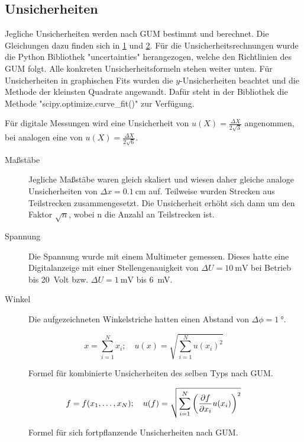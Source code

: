 \subsection{Unsicherheiten}\label{VGuD}

Jegliche Unsicherheiten werden nach GUM bestimmt und berechnet.
Die Gleichungen dazu finden sich in \ref{fig:GUM_combine} und \ref{fig:GUM_formula}.
Für die Unsicherheitsrechnungen wurde die Python Bibliothek "uncertainties" herangezogen, welche den Richtlinien des GUM folgt.
Alle konkreten Unsicherheitsformeln stehen weiter unten.
Für Unsicherheiten in graphischen Fits wurden die $y$-Unsicherheiten beachtet und die Methode der kleinsten Quadrate angewandt.
Dafür steht in der Bibliothek die Methode "scipy.optimize.curve\_fit()" zur Verfügung.

Für digitale Messungen wird eine Unsicherheit von $u(X) = \frac{\Delta X}{2\sqrt{3}}$ angenommen, bei analogen eine von $u(X) = \frac{\Delta X}{2\sqrt{6}}$.

\begin{description}
	\item[Maßstäbe]	Jegliche Maßstäbe waren gleich skaliert und wiesen daher gleiche analoge Unsicherheiten von $\Delta x = \SI{0.1}{\centi\meter}$ auf.
	Teilweise wurden Strecken aus Teilstrecken zusammengesetzt. Die Unsicherheit erhöht sich dann um den Faktor $\sqrt{n}$, wobei n die Anzahl an Teilstrecken ist.
	
	\item[Spannung] Die Spannung wurde mit einem Multimeter gemessen.
	Dieses hatte eine Digitalanzeige mit einer Stellengenauigkeit von $\Delta U = \SI{10}{\milli\volt}$ bei Betrieb bis \SI{20}{Volt} bzw. $\Delta U = \SI{1}{\milli\volt}$ bis \SI{6}{\milli\volt}.
	
	\item[Winkel] Die aufgezeichneten Winkelstriche hatten einen Abstand von $\Delta \phi = \SI{1}{\degree}$.
	
\end{description}

\begin{figure}[ht]
	\begin{equation*}
		x = \sum_{i=1}^{N} x_i
		;\quad
		u(x) = \sqrt{\sum_{i = 1}^{N} u(x_i)^2}
	\end{equation*}
	\caption{Formel für kombinierte Unsicherheiten des selben Typs nach GUM.}
	\label{fig:GUM_combine}
\end{figure}

\begin{figure}[ht]
	\begin{align*}
		f = f(x_1, \dots , x_N)
		;\quad
		u(f) = \sqrt{\sum_{i = 1}^{N}\left(\pdv{f}{x_i} u(x_i)\right) ^2}
	\end{align*}
	\caption{Formel für sich fortpflanzende Unsicherheiten nach GUM.}
	\label{fig:GUM_formula}
\end{figure}

